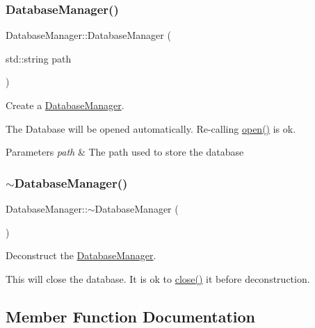 \subsubsection{\texorpdfstring{Database\+Manager()}{DatabaseManager()}}
{\footnotesize\ttfamily Database\+Manager\+::\+Database\+Manager (\begin{DoxyParamCaption}\item[{std\+::string}]{path }\end{DoxyParamCaption})}



Create a \hyperlink{class_database_manager}{Database\+Manager}. 

The Database will be opened automatically. Re-\/calling \hyperlink{class_database_manager_a6c583242d2a2971a285531886d08f377}{open()} is ok.


\begin{DoxyParams}{Parameters}
{\em path} & The path used to store the database \\
\hline
\end{DoxyParams}
\mbox{\label{class_database_manager_ae9b3a5da1e04fbb00faf8a034da1d063}} 
\subsubsection{\texorpdfstring{$\sim$\+Database\+Manager()}{~DatabaseManager()}}
{\footnotesize\ttfamily Database\+Manager\+::$\sim$\+Database\+Manager (\begin{DoxyParamCaption}{ }\end{DoxyParamCaption})}



Deconstruct the \hyperlink{class_database_manager}{Database\+Manager}. 

This will close the database. It is ok to \hyperlink{class_database_manager_a36c8ab027e11aba2464f384b18e814e5}{close()} it before deconstruction. 

\subsection{Member Function Documentation}
\mbox{\label{class_database_manager_a596c53099fb11d1cdddcc493c2ccb314}} 
